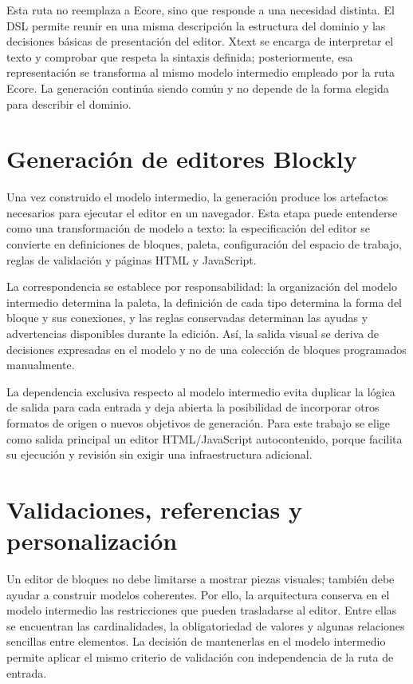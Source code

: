 Esta ruta no reemplaza a Ecore, sino que responde a una necesidad distinta. El
DSL permite reunir en una misma descripción la estructura del dominio y las
decisiones básicas de presentación del editor. Xtext se encarga de interpretar
el texto y comprobar que respeta la sintaxis definida; posteriormente, esa
representación se transforma al mismo modelo intermedio empleado por la ruta
Ecore. La generación continúa siendo común y no depende de la forma elegida para
describir el dominio.

\section{Generación de editores Blockly}
\label{sec:generacion-editores}

Una vez construido el modelo intermedio, la generación produce los artefactos
necesarios para ejecutar el editor en un navegador. Esta etapa puede entenderse
como una transformación de modelo a texto: la especificación del editor se
convierte en definiciones de bloques, paleta, configuración del espacio de trabajo,
reglas de validación y páginas HTML y JavaScript.

La correspondencia se establece por responsabilidad: la organización del modelo
intermedio determina la paleta, la definición de cada tipo determina la forma
del bloque y sus conexiones, y las reglas conservadas determinan las ayudas y
advertencias disponibles durante la edición. Así, la salida visual se deriva de
decisiones expresadas en el modelo y no de una colección de bloques programados
manualmente.

La dependencia exclusiva respecto al modelo intermedio evita duplicar la lógica
de salida para cada entrada y deja abierta la posibilidad de incorporar otros
formatos de origen o nuevos objetivos de generación. Para este trabajo se elige
como salida principal un editor HTML/JavaScript autocontenido, porque facilita
su ejecución y revisión sin exigir una infraestructura adicional.

\section{Validaciones, referencias y personalización}
\label{sec:validaciones-referencias-personalizacion}

Un editor de bloques no debe limitarse a mostrar piezas visuales; también debe
ayudar a construir modelos coherentes. Por ello, la arquitectura conserva en el
modelo intermedio las restricciones que pueden trasladarse al editor. Entre
ellas se encuentran las cardinalidades, la obligatoriedad de valores y algunas
relaciones sencillas entre elementos. La decisión de mantenerlas en el modelo
intermedio permite aplicar el mismo criterio de validación con independencia de
la ruta de entrada.

